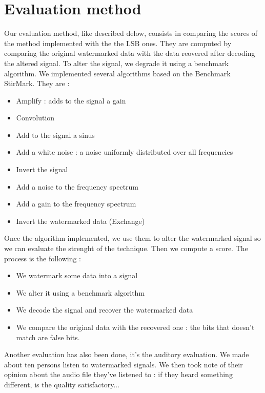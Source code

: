\section{Evaluation method}
Our evaluation method, like described delow, consists in comparing the scores of the method implemented with the the LSB ones.
They are computed by comparing the original watermarked data with the data reovered after decoding the altered signal. 
To alter the signal, we degrade it using a benchmark algorithm. We implemented several algorithms based on the Benchmark StirMark. They are :
\begin{itemize}
 \item Amplify : adds to the signal a gain
 \item Convolution
 \item Add to the signal a sinus 
 \item Add a white noise : a noise uniformly distributed over all frequencies
 \item Invert the signal
 \item Add a noise to the frequency spectrum
 \item Add a gain to the frequency spectrum
 \item Invert the watermarked data (Exchange)
\end{itemize}
Once the algorithm implemented, we use them to alter the watermarked signal so we can evaluate the strenght of the technique. Then we compute a score. The process is the following :
\begin{itemize}
 \item We watermark some data into a signal
 \item We alter it using a benchmark algorithm
 \item We decode the signal and recover the watermarked data
 \item We compare the original data with the recovered one : the bits that doesn't match are false bits.
\end{itemize}

Another evaluation has also been done, it's the auditory evaluation. We made about ten persons listen to watermarked signals. We then took note of their opinion about the audio file they've listened to : if they heard something different, is the quality satisfactory... 




